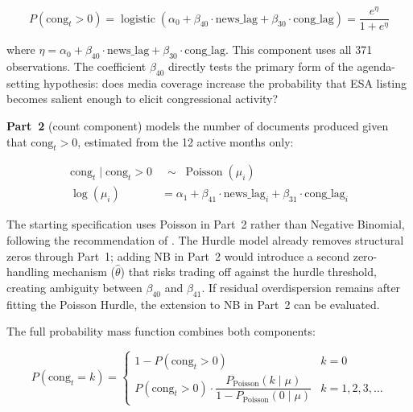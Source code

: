 \documentclass[11pt]{article}
\begin{document}
\begin{equation}
  P(\text{cong}_{t} > 0)
    = \operatorname{logistic}(
        \alpha_0
        + \beta_{40} \cdot \text{news\_lag}
        + \beta_{30} \cdot \text{cong\_lag}
      )
    = \frac{e^{\eta}}{1+e^{\eta}}
  \label{eq:hurdle1}
\end{equation}
 
where $\eta = \alpha_0 + \beta_{40}\cdot\text{news\_lag} +
\beta_{30}\cdot\text{cong\_lag}$. This component uses all 371
observations. The coefficient $\beta_{40}$ directly tests the primary
form of the agenda-setting hypothesis: does media coverage increase the
probability that ESA listing becomes salient enough to elicit
congressional activity?
 
\textbf{Part~2} (count component) models the number of documents
produced given that $\text{cong}_{t} > 0$, estimated from the 12 active
months only:
 
\begin{align}
  \text{cong}_{t} \mid \text{cong}_{t} > 0
    &\;\sim\; \operatorname{Poisson}(\mu_i)
  \label{eq:hurdle2a} \\[3pt]
  \log(\mu_i)
    &= \alpha_1
       + \beta_{41} \cdot \text{news\_lag}_i
       + \beta_{31} \cdot \text{cong\_lag}_i
  \label{eq:hurdle2b}
\end{align}
 
The starting specification uses Poisson in Part~2 rather than Negative
Binomial, following the recommendation of \citet{Zeileis2008}. The
Hurdle model already removes structural zeros through Part~1; adding NB
in Part~2 would introduce a second zero-handling mechanism ($\hat\theta$)
that risks trading off against the hurdle threshold, creating ambiguity
between $\beta_{40}$ and $\beta_{41}$. If residual overdispersion
remains after fitting the Poisson Hurdle, the extension to NB in Part~2
can be evaluated.
 
The full probability mass function combines both components:
 
\begin{equation}
  P(\text{cong}_{t} = k) =
  \begin{cases}
    1 - P(\text{cong}_{t} > 0)
      & k = 0 \\[6pt]
    P(\text{cong}_{t} > 0) \cdot
    \dfrac{P_{\text{Poisson}}(k \mid \mu)}
          {1 - P_{\text{Poisson}}(0 \mid \mu)}
      & k = 1, 2, 3, \ldots
  \end{cases}
  \label{eq:hurdle_pmf}
\end{equation}
 
\end{document}
